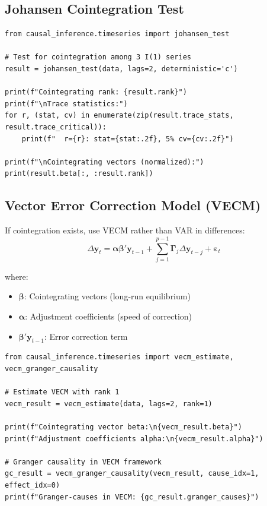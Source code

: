 \subsection{Johansen Cointegration Test}

\begin{verbatim}
from causal_inference.timeseries import johansen_test

# Test for cointegration among 3 I(1) series
result = johansen_test(data, lags=2, deterministic='c')

print(f"Cointegrating rank: {result.rank}")
print(f"\nTrace statistics:")
for r, (stat, cv) in enumerate(zip(result.trace_stats, result.trace_critical)):
    print(f"  r={r}: stat={stat:.2f}, 5% cv={cv:.2f}")

print(f"\nCointegrating vectors (normalized):")
print(result.beta[:, :result.rank])
\end{verbatim}

\subsection{Vector Error Correction Model (VECM)}

If cointegration exists, use VECM rather than VAR in differences:
\begin{equation}
\Delta \mathbf{y}_t = \boldsymbol{\alpha} \boldsymbol{\beta}' \mathbf{y}_{t-1} + \sum_{j=1}^{p-1} \boldsymbol{\Gamma}_j \Delta \mathbf{y}_{t-j} + \boldsymbol{\varepsilon}_t
\end{equation}

where:
\begin{itemize}
    \item $\boldsymbol{\beta}$: Cointegrating vectors (long-run equilibrium)
    \item $\boldsymbol{\alpha}$: Adjustment coefficients (speed of correction)
    \item $\boldsymbol{\beta}' \mathbf{y}_{t-1}$: Error correction term
\end{itemize}

\begin{verbatim}
from causal_inference.timeseries import vecm_estimate, vecm_granger_causality

# Estimate VECM with rank 1
vecm_result = vecm_estimate(data, lags=2, rank=1)

print(f"Cointegrating vector beta:\n{vecm_result.beta}")
print(f"Adjustment coefficients alpha:\n{vecm_result.alpha}")

# Granger causality in VECM framework
gc_result = vecm_granger_causality(vecm_result, cause_idx=1, effect_idx=0)
print(f"Granger-causes in VECM: {gc_result.granger_causes}")
\end{verbatim}



